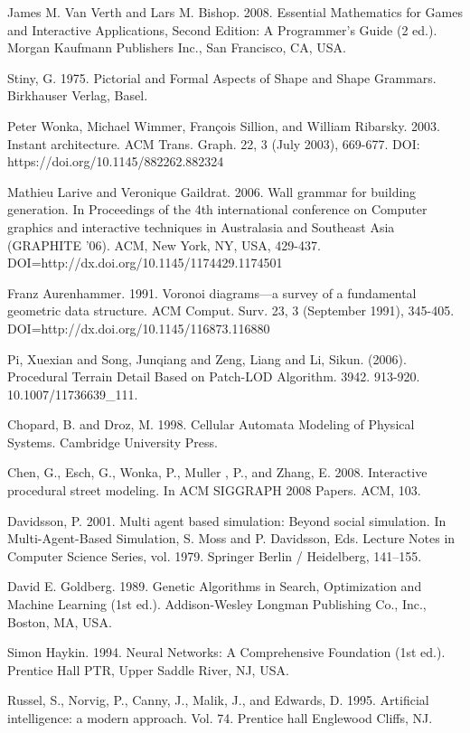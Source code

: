 \documentclass[runningheads]{llncs}
\begin{document}
\begin{thebibliography}{40}
James M. Van Verth and Lars M. Bishop. 2008. Essential Mathematics for Games and Interactive Applications, Second Edition: A Programmer's Guide (2 ed.). Morgan Kaufmann Publishers Inc., San Francisco, CA, USA.

Stiny, G. 1975. Pictorial and Formal Aspects of Shape and Shape Grammars. Birkhauser Verlag, Basel.

Peter Wonka, Michael Wimmer, François Sillion, and William Ribarsky. 2003. Instant architecture. ACM Trans. Graph. 22, 3 (July 2003), 669-677. DOI: https://doi.org/10.1145/882262.882324

Mathieu Larive and Veronique Gaildrat. 2006. Wall grammar for building generation. In Proceedings of the 4th international conference on Computer graphics and interactive techniques in Australasia and Southeast Asia (GRAPHITE '06). ACM, New York, NY, USA, 429-437. DOI=http://dx.doi.org/10.1145/1174429.1174501

Franz Aurenhammer. 1991. Voronoi diagrams—a survey of a fundamental geometric data structure. ACM Comput. Surv. 23, 3 (September 1991), 345-405. DOI=http://dx.doi.org/10.1145/116873.116880

Pi, Xuexian and Song, Junqiang and Zeng, Liang and Li, Sikun. (2006). Procedural Terrain Detail Based on Patch-LOD Algorithm. 3942. 913-920. 10.1007/11736639\_111. 

Chopard, B. and Droz, M. 1998. Cellular Automata Modeling of Physical Systems. Cambridge University Press.

Chen, G., Esch, G., Wonka, P., Muller , P., and Zhang, E. 2008. Interactive procedural street modeling. In ACM SIGGRAPH 2008 Papers. ACM, 103.

Davidsson, P. 2001. Multi agent based simulation: Beyond social simulation. In Multi-Agent-Based Simulation, S. Moss and P. Davidsson, Eds. Lecture Notes in Computer Science Series, vol. 1979. Springer Berlin / Heidelberg, 141–155. 

David E. Goldberg. 1989. Genetic Algorithms in Search, Optimization and Machine Learning (1st ed.). Addison-Wesley Longman Publishing Co., Inc., Boston, MA, USA.

Simon Haykin. 1994. Neural Networks: A Comprehensive Foundation (1st ed.). Prentice Hall PTR, Upper Saddle River, NJ, USA.

Russel, S., Norvig, P., Canny, J., Malik, J., and Edwards, D. 1995. Artificial intelligence: a modern approach. Vol. 74. Prentice hall Englewood Cliffs, NJ.

\end{thebibliography}
\end{document}
